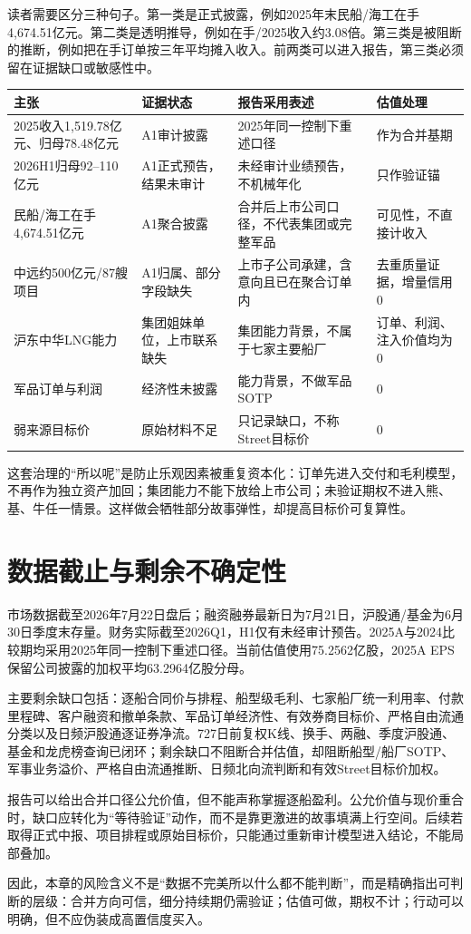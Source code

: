 读者需要区分三种句子。第一类是正式披露，例如2025年末民船/海工在手4,674.51亿元。第二类是透明推导，例如在手/2025收入约3.08倍。第三类是被阻断的推断，例如把在手订单按三年平均摊入收入。前两类可以进入报告，第三类必须留在证据缺口或敏感性中。

\begin{exhibitbox}[关键主张治理]
\small
\begin{tabularx}{\exhibitboxwidth}{L{4.0cm}L{2.4cm}L{3.6cm}X}
\toprule
\textbf{主张} & \textbf{证据状态} & \textbf{报告采用表述} & \textbf{估值处理} \\
\midrule
2025收入1,519.78亿元、归母78.48亿元 & A1审计披露 & 2025年同一控制下重述口径 & 作为合并基期 \\
2026H1归母92--110亿元 & A1正式预告，结果未审计 & 未经审计业绩预告，不机械年化 & 只作验证锚 \\
民船/海工在手4,674.51亿元 & A1聚合披露 & 合并后上市公司口径，不代表集团或完整军品 & 可见性，不直接计收入 \\
中远约500亿元/87艘项目 & A1归属、部分字段缺失 & 上市子公司承建，含意向且已在聚合订单内 & 去重质量证据，增量信用0 \\
沪东中华LNG能力 & 集团姐妹单位，上市联系缺失 & 集团能力背景，不属于七家主要船厂 & 订单、利润、注入价值均为0 \\
军品订单与利润 & 经济性未披露 & 能力背景，不做军品SOTP & 0 \\
弱来源目标价 & 原始材料不足 & 只记录缺口，不称Street目标价 & 0 \\
\bottomrule
\end{tabularx}
\end{exhibitbox}

这套治理的“所以呢”是防止乐观因素被重复资本化：订单先进入交付和毛利模型，不再作为独立资产加回；集团能力不能下放给上市公司；未验证期权不进入熊、基、牛任一情景。这样做会牺牲部分故事弹性，却提高目标价可复算性。

\section{数据截止与剩余不确定性}

市场数据截至2026年7月22日盘后；融资融券最新日为7月21日，沪股通/基金为6月30日季度末存量。财务实际截至2026Q1，H1仅有未经审计预告。2025A与2024比较期均采用2025年同一控制下重述口径。当前估值使用75.2562亿股，2025A EPS保留公司披露的加权平均63.2964亿股分母。

主要剩余缺口包括：逐船合同价与排程、船型级毛利、七家船厂统一利用率、付款里程碑、客户融资和撤单条款、军品订单经济性、有效券商目标价、严格自由流通分类以及日频沪股通逐证券净流。727日前复权K线、换手、两融、季度沪股通、基金和龙虎榜查询已闭环；剩余缺口不阻断合并估值，却阻断船型/船厂SOTP、军事业务溢价、严格自由流通推断、日频北向流判断和有效Street目标价加权。

\begin{sourcequalitybox}[证据边界对动作的约束]
报告可以给出合并口径公允价值，但不能声称掌握逐船盈利。公允价值与现价重合时，缺口应转化为“等待验证”动作，而不是靠更激进的故事填满上行空间。后续若取得正式中报、项目排程或原始目标价，只能通过重新审计模型进入结论，不能局部叠加。
\end{sourcequalitybox}

因此，本章的风险含义不是“数据不完美所以什么都不能判断”，而是精确指出可判断的层级：合并方向可信，细分持续期仍需验证；估值可做，期权不计；行动可以明确，但不应伪装成高置信度买入。

